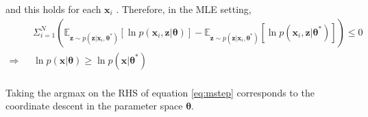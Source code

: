 \documentclass[a4]{article}
\begin{document}
and this holds for each
$\mathbf{x}_i$
. Therefore, in the MLE setting,
\begin{equation}
\begin{aligned}
    &\Sigma_{i = 1}^N \left(
            \mathbb{E}_{ \mathbf{z} \sim p( \mathbf{z} | \mathbf{x}_i, \bm{\theta^*} ) }
            \left[
                \ln p( \mathbf{x}_i, \mathbf{z} | \bm{\theta} )
            \right]
        -
            \mathbb{E}_{ \mathbf{z} \sim p( \mathbf{z} | \mathbf{x}_i,\bm{\theta^*} ) }
            \left[
                \ln p( \mathbf{x}_i, \mathbf{z} | \bm{\theta^*} )
            \right]
    \right) \le 0\\
\Rightarrow\:\:\:
        &\ln p( \mathbf{x} | \bm{\theta} ) 
    \ge  \ln p( \mathbf{x} | \bm{\theta^*} )\label{eq:mstep}\\
\end{aligned}
\end{equation}

Taking the argmax on the RHS of equation \ref{eq:mstep} corresponds to the coordinate descent in the parameter space $\bm{\theta}$.


{}

\end{document}
